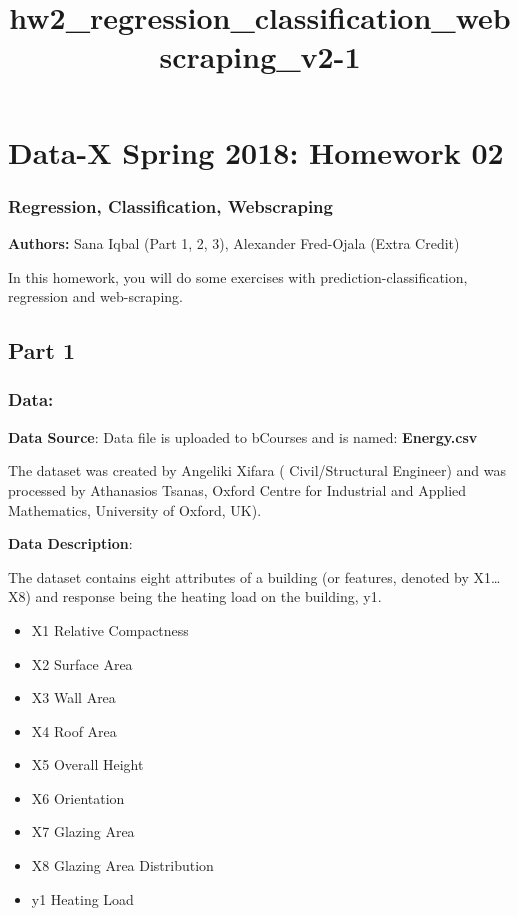 \documentclass[11pt]{article}
\title{hw2\_regression\_classification\_webscraping\_v2-1}
\providecommand{\tightlist}{%
      \setlength{\itemsep}{0pt}\setlength{\parskip}{0pt}}
\begin{document}
    
    
    \maketitle
    
    

    
    \hypertarget{data-x-spring-2018-homework-02}{%
\section{Data-X Spring 2018: Homework
02}\label{data-x-spring-2018-homework-02}}

\hypertarget{regression-classification-webscraping}{%
\subsubsection{Regression, Classification,
Webscraping}\label{regression-classification-webscraping}}

\textbf{Authors:} Sana Iqbal (Part 1, 2, 3), Alexander Fred-Ojala (Extra
Credit)

In this homework, you will do some exercises with
prediction-classification, regression and web-scraping.

    \hypertarget{part-1}{%
\subsection{Part 1}\label{part-1}}

    \hypertarget{data}{%
\subsubsection{Data:}\label{data}}

\textbf{Data Source}: Data file is uploaded to bCourses and is named:
\textbf{Energy.csv}

The dataset was created by Angeliki Xifara ( Civil/Structural Engineer)
and was processed by Athanasios Tsanas, Oxford Centre for Industrial and
Applied Mathematics, University of Oxford, UK).

\textbf{Data Description}:

The dataset contains eight attributes of a building (or features,
denoted by X1\ldots{}X8) and response being the heating load on the
building, y1.

\begin{itemize}
\tightlist
\item
  X1 Relative Compactness
\item
  X2 Surface Area
\item
  X3 Wall Area
\item
  X4 Roof Area
\item
  X5 Overall Height
\item
  X6 Orientation
\item
  X7 Glazing Area
\item
  X8 Glazing Area Distribution
\item
  y1 Heating Load
\end{itemize}
\end{document}
